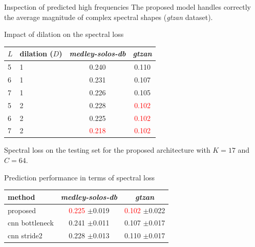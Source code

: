 \documentclass[compress]{beamer}
\begin{document}
\begin{frame}{Inspection of predicted high frequencies}
{    The proposed model handles correctly the average magnitude of complex spectral shapes (\textit{gtzan} dataset).
    }
\end{frame}

\begin{frame}{Impact of dilation on the spectral loss}
  \begin{center}
\begin{tabular}{llcc}
$L$ & dilation ($D$) & \textit{medley-solos-db} & \textit{gtzan} \\
\hline
5 & 1 & 0.240  & 0.110 \\
6 & 1 & 0.231  & 0.107 \\
7 & 1 & 0.226  & 0.105 \\
5 & 2 & 0.228  & \textcolor{red}{0.102} \\
6 & 2 & 0.225  & \textcolor{red}{0.102} \\
7 & 2 & \textcolor{red}{0.218}  & \textcolor{red}{0.102} \\
\end{tabular}

Spectral loss on the testing set for the proposed architecture with $K=17$ and $C=64$.
  \end{center}
\end{frame}

\begin{frame}{Prediction performance in terms of spectral loss}
  \begin{center}
\begin{tabular}{lcc}
method & \textit{medley-solos-db} & \textit{gtzan} \\
\hline
proposed & \textcolor{red}{0.225} $\pm$0.019 & \textcolor{red}{0.102} $\pm$0.022 \\
cnn bottleneck & 0.241 $\pm$0.011 & 0.107 $\pm$0.017 \\
cnn stride2 & 0.228 $\pm$0.013 & 0.110 $\pm$0.017 \\
\end{tabular}
\end{center}
\end{frame}
\end{document}
